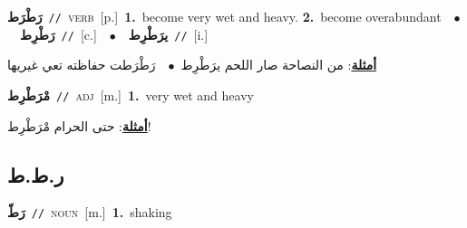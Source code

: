 \documentclass[10pt,a4paper,twoside]{article} %
\begin{document}
\begin{multicols}{2}
{\setlength\topsep{0pt}\textbf{\foreignlanguage{arabic}{رَطْرَط}}\ {\color{gray}\texttt{//}\color{black}}\ \textsc{verb}\ [p.]\ \textbf{1.}~become very wet and heavy.  \textbf{2.}~become overabundant\ \ $\bullet$\ \ \setlength\topsep{0pt}\textbf{\foreignlanguage{arabic}{رَطْرِط}}\ {\color{gray}\texttt{//}\color{black}}\ [c.]\ \ $\bullet$\ \ \setlength\topsep{0pt}\textbf{\foreignlanguage{arabic}{يرَطْرِط}}\ {\color{gray}\texttt{//}\color{black}}\ [i.]\  \begin{flushright}\color{gray}\foreignlanguage{arabic}{\textbf{\underline{\foreignlanguage{arabic}{أمثلة}}}: من النصاحة صار اللحم يرَطْرِط\ $\bullet$\ \  رَطْرَطت حفاظته تعي غيريها}\end{flushright}\color{black}} \vspace{2mm}

{\setlength\topsep{0pt}\textbf{\foreignlanguage{arabic}{مْرَطْرِط}}\ {\color{gray}\texttt{//}\color{black}}\ \textsc{adj}\ [m.]\ \textbf{1.}~very wet and heavy\  \begin{flushright}\color{gray}\foreignlanguage{arabic}{\textbf{\underline{\foreignlanguage{arabic}{أمثلة}}}: حتى الحرام مْرَطْرِط!}\end{flushright}\color{black}} \vspace{2mm}

\vspace{-3mm}
\subsection*{\color{blue}\foreignlanguage{arabic}{ر.ط.ط}\color{blue}{}} 

{\setlength\topsep{0pt}\textbf{\foreignlanguage{arabic}{رَطّ}}\ {\color{gray}\texttt{//}\color{black}}\ \textsc{noun}\ [m.]\ \textbf{1.}~shaking\ } \vspace{2mm}


\end{multicols}
\end{document}
